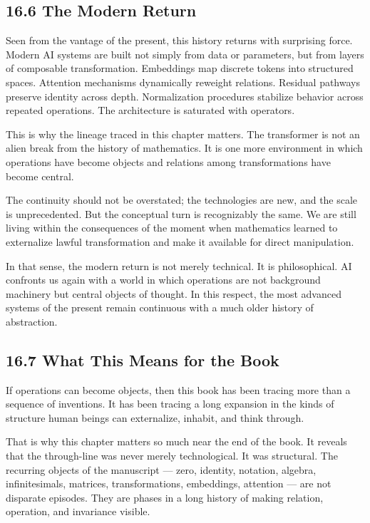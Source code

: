 \documentclass[
]{article}
\begin{document}
\hypertarget{the-modern-return}{%
\subsection{16.6 The Modern Return}\label{the-modern-return}}

Seen from the vantage of the present, this history returns with
surprising force. Modern AI systems are built not simply from data or
parameters, but from layers of composable transformation. Embeddings map
discrete tokens into structured spaces. Attention mechanisms dynamically
reweight relations. Residual pathways preserve identity across depth.
Normalization procedures stabilize behavior across repeated operations.
The architecture is saturated with operators.

This is why the lineage traced in this chapter matters. The transformer
is not an alien break from the history of mathematics. It is one more
environment in which operations have become objects and relations among
transformations have become central.

The continuity should not be overstated; the technologies are new, and
the scale is unprecedented. But the conceptual turn is recognizably the
same. We are still living within the consequences of the moment when
mathematics learned to externalize lawful transformation and make it
available for direct manipulation.

In that sense, the modern return is not merely technical. It is
philosophical. AI confronts us again with a world in which operations
are not background machinery but central objects of thought. In this
respect, the most advanced systems of the present remain continuous with
a much older history of abstraction.

\hypertarget{what-this-means-for-the-book}{%
\subsection{16.7 What This Means for the
Book}\label{what-this-means-for-the-book}}

If operations can become objects, then this book has been tracing more
than a sequence of inventions. It has been tracing a long expansion in
the kinds of structure human beings can externalize, inhabit, and think
through.

That is why this chapter matters so much near the end of the book. It
reveals that the through-line was never merely technological. It was
structural. The recurring objects of the manuscript --- zero, identity,
notation, algebra, infinitesimals, matrices, transformations,
embeddings, attention --- are not disparate episodes. They are phases in
a long history of making relation, operation, and invariance visible.
\end{document}
